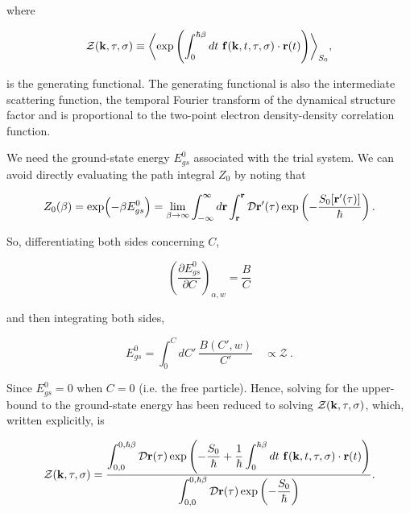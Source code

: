 where

\begin{equation}
    \mathcal{Z}(\vb{k}, \tau, \sigma) \equiv \biggl\langle \exp\left(\int_0^{\hbar\beta} dt\ \vb{f}(\vb{k}, t, \tau, \sigma) \cdot \vb{r}(t) \right) \biggr\rangle_{S_0},
\end{equation}

is the generating functional. The generating functional is also the intermediate scattering function, the temporal Fourier transform of the dynamical structure factor and is proportional to the two-point electron density-density correlation function. 

We need the ground-state energy $E^0_{gs}$ associated with the trial system. We can avoid directly evaluating the path integral $Z_0$ by noting that

\begin{equation}\label{eqn:trial_partition}
    Z_0(\beta) = \exp(-\beta E^0_{gs}) = \lim_{\beta \to \infty} \int^{\infty}_{-\infty} d\vb{r} \int^{\vb{r}}_{\vb{r}} \mathcal{D}\vb{r'}(\tau) \exp\left(-\frac{S_0[\vb{r'}(\tau)]}{\hbar}\right).
\end{equation}

So, differentiating both sides concerning $C$,

\begin{equation}
     \left( \frac{\partial E_{gs}^0}{\partial C}\right)_{\alpha, w} = \frac{B}{C}
\end{equation}

and then integrating both sides,

\begin{equation}
    E^{0}_{gs} = \int^{C}_0 dC'\ \frac{B(C', w)}{C'} \quad \propto \mathcal{Z} \ .
\end{equation}

Since $ E^{0}_{gs} = 0$ when $C = 0$ (i.e. the free particle). Hence, solving for the upper-bound to the ground-state energy has been reduced to solving $\mathcal{Z}(\vb{k}, \tau, \sigma)$, which, written explicitly, is

\begin{equation}\label{eqn:gen_func}
    \mathcal{Z}(\vb{k}, \tau, \sigma) = \frac{\displaystyle \int^{0, \hbar\beta}_{0,0} \mathcal{D}\vb{r}(\tau) \exp\left(-\frac{S_0}{\hbar} +  \frac{1}{\hbar}\int^{\hbar\beta}_0 dt\ \vb{f}(\vb{k}, t, \tau, \sigma) \cdot \vb{r}(t) \right)}{\displaystyle \int^{0, \hbar\beta}_{0, 0} \mathcal{D}\vb{r}(\tau) \exp\left(-\frac{S_0}{\hbar}\right)}.
\end{equation}

